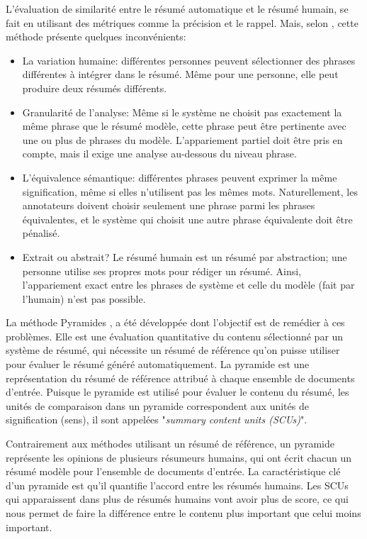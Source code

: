 \documentclass[a4paper,12pt,oneside]{../use/ESIthesis}
\begin{document}
L'évaluation de similarité entre le résumé automatique et le résumé humain, se fait en utilisant des métriques comme la précision et le rappel. 
Mais, selon \cite{07-nenkova-al}, cette méthode présente quelques inconvénients: 
\begin{itemize}
\item La variation humaine: différentes personnes peuvent sélectionner des phrases différentes à intégrer dans le résumé. 
Même pour une personne, elle peut produire deux résumés différents. 

\item Granularité de l'analyse: Même si le système ne choisit pas exactement la même phrase que le résumé modèle, cette phrase peut être pertinente avec une ou plus de phrases du modèle. 
L'appariement partiel doit être pris en compte, mais il exige une analyse au-dessous du niveau phrase. 

\item L'équivalence sémantique: différentes phrases peuvent exprimer la même signification, même si elles n'utilisent pas les mêmes mots. 
Naturellement, les annotateurs doivent choisir seulement une phrase parmi les phrases équivalentes, et le système qui choisit une autre phrase équivalente doit être pénalisé. 

\item Extrait ou abstrait? Le résumé humain est un résumé par abstraction; une personne utilise ses propres mots pour rédiger un résumé. 
Ainsi, l'appariement exact entre les phrases de système et celle du modèle (fait par l'humain) n'est pas possible. 
\end{itemize}

La méthode Pyramides \cite{07-nenkova-al}, a été développée dont l'objectif est de remédier à ces problèmes.
Elle est une évaluation quantitative du contenu sélectionné par un système de résumé, qui nécessite un résumé de référence qu'on puisse utiliser pour évaluer le résumé généré automatiquement.
La pyramide est une représentation du résumé de référence attribué à chaque ensemble de documents d'entrée. 
Puisque le pyramide est utilisé pour évaluer le contenu du résumé, les unités de comparaison dans un pyramide correspondent aux unités de signification (sens), il sont appelées "\textit{summary content units (SCUs)}". 

Contrairement aux méthodes utilisant un résumé de référence, un pyramide représente les opinions de plusieurs résumeurs humains, qui ont écrit chacun un résumé modèle pour l'ensemble de documents d'entrée. 
La caractéristique clé d'un pyramide est qu'il quantifie l'accord entre les résumés humains. 
Les SCUs qui apparaissent dans plus de résumés humains vont avoir plus de score, ce qui nous permet de faire la différence entre le contenu plus important que celui moins important. 
\end{document}
